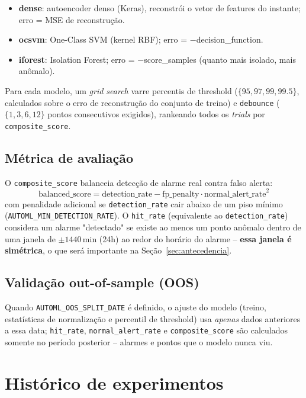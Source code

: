 \documentclass[11pt,a4paper]{article}
\begin{document}
\begin{itemize}
  \item \textbf{dense}: autoencoder denso (Keras), reconstrói o vetor de
        features do instante; erro = MSE de reconstrução.
  \item \textbf{ocsvm}: One-Class SVM (kernel RBF); erro = $-$decision\_function.
  \item \textbf{iforest}: Isolation Forest; erro = $-$score\_samples (quanto
        mais isolado, mais anômalo).
\end{itemize}

Para cada modelo, um \emph{grid search} varre percentis de threshold
($\{95, 97, 99, 99.5\}$, calculados sobre o erro de reconstrução do
conjunto de treino) e \texttt{debounce} ($\{1, 3, 6, 12\}$ pontos
consecutivos exigidos), rankeando todos os \emph{trials} por
\texttt{composite\_score}.

\subsection{Métrica de avaliação}

O \texttt{composite\_score} balanceia detecção de alarme real contra falso
alerta:
\[
\text{balanced\_score} = \text{detection\_rate} - \text{fp\_penalty} \cdot \text{normal\_alert\_rate}^2
\]
com penalidade adicional se \texttt{detection\_rate} cair abaixo de um piso
mínimo (\texttt{AUTOML\_MIN\_DETECTION\_RATE}). O \texttt{hit\_rate}
(equivalente ao \texttt{detection\_rate}) considera um alarme "detectado" se
existe ao menos um ponto anômalo dentro de uma janela de $\pm 1440$\,min
(24h) ao redor do horário do alarme -- \textbf{essa janela é simétrica},
o que será importante na Seção~\ref{sec:antecedencia}.

\subsection{Validação out-of-sample (OOS)}

Quando \texttt{AUTOML\_OOS\_SPLIT\_DATE} é definido, o ajuste do modelo
(treino, estatísticas de normalização e percentil de threshold) usa
\emph{apenas} dados anteriores a essa data; \texttt{hit\_rate},
\texttt{normal\_alert\_rate} e \texttt{composite\_score} são calculados
somente no período posterior -- alarmes e pontos que o modelo nunca viu.

\section{Histórico de experimentos}
\label{sec:historico}
\end{document}
